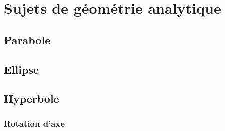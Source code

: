 \chapter{Sujets de géométrie analytique}
\section{Parabole}
\section{Ellipse}
\section{Hyperbole}
\subsection{Rotation d'axe}